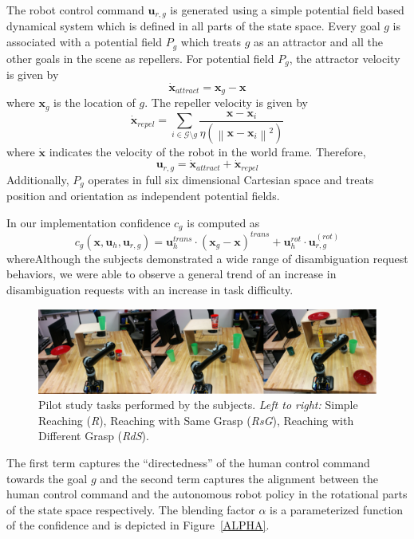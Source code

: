 \documentclass[conference]{IEEEtran}
\newcommand{\norm}[1]{\left\lVert#1\right\rVert}
\begin{document}
The robot control command $\boldsymbol{u}_{r,g}$ is generated using a simple potential field based dynamical system which is defined in all parts of the state space. Every goal $g$ is associated with a potential field $P_g$ which treats $g$ as an attractor and all the other goals in the scene as repellers. For potential field $P_g$, the attractor velocity is given by
\begin{equation*}
\dot{\boldsymbol{x}}_{attract} = \boldsymbol{x}_{g} - \boldsymbol{x}
\end{equation*}
where $\boldsymbol{x}_{g}$ is the location of $g$. The repeller velocity is given by
\begin{equation*}
\dot{\boldsymbol{x}}_{repel} = \sum_{i \in \mathcal{G} \setminus g} \frac{\boldsymbol{x} - \boldsymbol{x}_{i}}{\eta(\norm{\boldsymbol{x} - \boldsymbol{x}_{i}}^2)}
\end{equation*}
where $\dot{\boldsymbol{x}}$ indicates the velocity of the robot in the world frame. Therefore, 
\begin{equation*}
\boldsymbol{u}_{r,g} = \dot{\boldsymbol{x}}_{attract} + \dot{\boldsymbol{x}}_{repel} 
\end{equation*}
Additionally, $P_g$ operates in full six dimensional Cartesian space and treats position and orientation as independent potential fields. 

In our implementation confidence $c_g$ is computed as
\begin{equation}\label{E1}
c_g(\boldsymbol{x}, \boldsymbol{u}_h, \boldsymbol{u}_{r,g}) = \boldsymbol{u}_{h}^{trans}\cdot(\boldsymbol{x}_{g} - \boldsymbol{x})^{trans} + \boldsymbol{u}_h^{rot}\cdot\boldsymbol{u}_{r,g}^{(rot)}
\end{equation}
whereAlthough the subjects demonstrated a wide range of disambiguation request behaviors, we were able to observe a general trend of an increase in disambiguation requests with an increase in task difficulty.
\begin{figure}[ht]
	\centering
	\includegraphics[width = 1\hsize]{./figures/TASKS.png}
	\caption{Pilot study tasks performed by the subjects. \textit{Left to right:} Simple Reaching (\textit{R}), Reaching with Same Grasp (\textit{RsG}), Reaching with Different Grasp (\textit{RdS}).}
	\label{TASKS}
\end{figure}
The first term captures the ``directedness'' of the human control command towards the goal $g$ and the second term captures the alignment between the human control command and the autonomous robot policy in the rotational parts of the state space respectively. 
The blending factor $\alpha$ is a parameterized function of the confidence and is depicted in Figure~\ref{ALPHA}.
\end{document}
